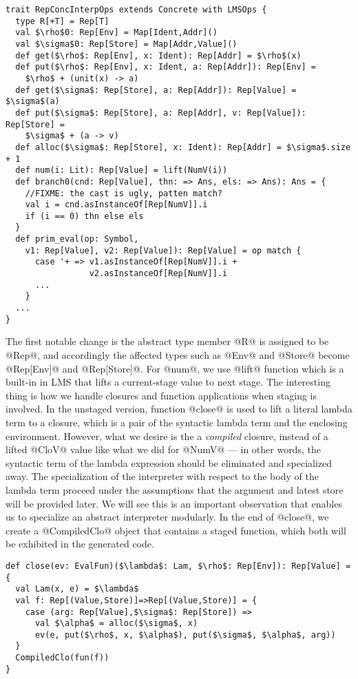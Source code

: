 \begin{lstlisting}
trait RepConcInterpOps extends Concrete with LMSOps {
  type R[+T] = Rep[T]
  val $\rho$0: Rep[Env] = Map[Ident,Addr]()
  val $\sigma$0: Rep[Store] = Map[Addr,Value]()
  def get($\rho$: Rep[Env], x: Ident): Rep[Addr] = $\rho$(x)
  def put($\rho$: Rep[Env], x: Ident, a: Rep[Addr]): Rep[Env] = 
    $\rho$ + (unit(x) -> a)
  def get($\sigma$: Rep[Store], a: Rep[Addr]): Rep[Value] = $\sigma$(a)
  def put($\sigma$: Rep[Store], a: Rep[Addr], v: Rep[Value]): Rep[Store] = 
    $\sigma$ + (a -> v)
  def alloc($\sigma$: Rep[Store], x: Ident): Rep[Addr] = $\sigma$.size + 1
  def num(i: Lit): Rep[Value] = lift(NumV(i))
  def branch0(cnd: Rep[Value], thn: => Ans, els: => Ans): Ans = {
    //FIXME: the cast is ugly, patten match?
    val i = cnd.asInstanceOf[Rep[NumV]].i
    if (i == 0) thn else els
  }
  def prim_eval(op: Symbol, 
    v1: Rep[Value], v2: Rep[Value]): Rep[Value] = op match {
      case '+ => v1.asInstanceOf[Rep[NumV]].i + 
                 v2.asInstanceOf[Rep[NumV]].i
      ...
    }
  ...
}
\end{lstlisting}

The first notable change is the abstract type member @R@ is assigned to be @Rep@, and accordingly the affected 
types such as @Env@ and @Store@ become @Rep[Env]@ and @Rep[Store]@. For @num@, we use @lift@ function which is a
built-in in LMS that lifts a current-stage value to next stage.
The interesting thing is how we handle closures and function applications when staging is involved.
In the unstaged version, function @close@ is used to lift a literal lambda term to a closure, which
is a pair of the syntactic lambda term and the enclosing environment.
However, what we desire is the a \textit{compiled} closure, instead of a lifted @CloV@ value like 
what we did for @NumV@ --- in other words, the syntactic term of the lambda expression should be 
eliminated and specialized away.
The specialization of the interpreter with respect to the body of the lambda term proceed under the
assumptions that the argument and latest store will be provided later. 
We will see this is an important observation that enables us to specialize an abstract interpreter modularly.
In the end of @close@, we create a @CompiledClo@ object that contains a staged function, which both will be
exhibited in the generated code.

\begin{lstlisting}
def close(ev: EvalFun)($\lambda$: Lam, $\rho$: Rep[Env]): Rep[Value] = {
  val Lam(x, e) = $\lambda$
  val f: Rep[(Value,Store)]=>Rep[(Value,Store)] = { 
    case (arg: Rep[Value],$\sigma$: Rep[Store]) =>
      val $\alpha$ = alloc($\sigma$, x)
      ev(e, put($\rho$, x, $\alpha$), put($\sigma$, $\alpha$, arg)) 
  }
  CompiledClo(fun(f))
}
\end{lstlisting}

